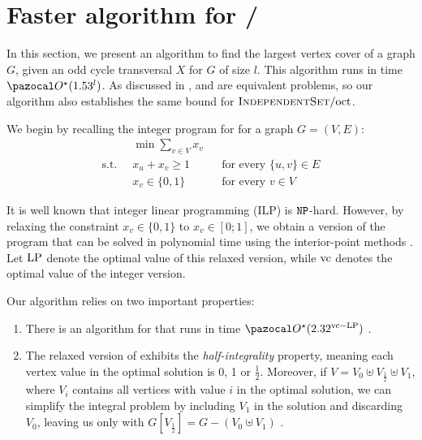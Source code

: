 \section{Faster algorithm for /\oct}
\label{section:indset-oct}

In this section, we present an algorithm to find the largest vertex cover of a graph $G$, given an odd cycle transversal $X$ for $G$ of size $l$. This algorithm runs in time $\O^\star(1.53^l)$. As discussed in ,  and  are equivalent problems, so our algorithm also establishes the same bound for $\textsc{IndependentSet}/\text{oct}$.

\medskip

We begin by recalling the integer program for  for a graph $G = (V, E)$:
\begin{align*}
    &\min \sum_{v \in V} x_v\\
    \text{s.t.}\;\; & x_u + x_v \geq 1 &&\text{for every } \{u,v\} \in E\\
    & x_v \in \{0,1\} &&\text{for every } v \in V
\end{align*}
    
It is well known that integer linear programming (ILP) is $\texttt{NP}$-hard. However, by relaxing the constraint $x_v \in \{0, 1\}$ to $x_v \in [0; 1]$, we obtain a version of the program that can be solved in polynomial time using the \mbox{interior-point} methods \cite{karmarkar1984new}. Let $\text{LP}$ denote the optimal value of this relaxed version, while $\text{vc}$ denotes the optimal value of the integer version.

\medskip

Our algorithm relies on two important properties:
\begin{enumerate}
    \item There is an algorithm for  that runs in time $\O^\star(2.32^{\vc - \LP})$ \cite{lokshtanov2014faster}.
    \item The relaxed version of  exhibits the \textit{half-integrality} property, meaning each vertex value in the optimal solution is 0, 1 or $\frac{1}{2}$. Moreover, if $V = V_0 \uplus V_{\frac{1}{2}} \uplus V_1$, where $V_i$ contains all vertices with value $i$ in the optimal solution, we can simplify the integral  problem by including $V_1$ in the solution and discarding $V_0$, leaving us only with $G[V_{\frac{1}{2}}] = G - (V_0 \uplus V_1)$ \cite{nemhauser1975vertex}.
\end{enumerate}

